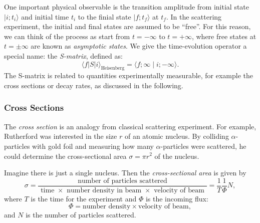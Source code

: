 One important physical observable is the transition amplitude from initial state $|i;t_i\rangle$ and initial time $t_i$ to the finial state $|f;t_f\rangle$ at $t_f$.
In the scattering experiment, the initial and final states are assumed to be ``free''.
For this reason, we can think of the process as start from $t=-\infty$ to $t=+\infty$, where free states at $t=\pm \infty$ are known as \textit{asymptotic states}.
We give the time-evolution operator a special name: the \textit{S-matrix}, defined as:
\begin{equation}
	\langle f|S| i\rangle_{\text{Heisenberg}}
	= \langle f ; \infty \mid i ;-\infty\rangle.
\end{equation}
The S-matrix is related to quantities experimentally measurable, for example the cross sections or decay rates, as discussed in the following.

\subsubsection{Cross Sections}
The \textit{cross section} is an analogy from classical scattering experiment.
For example, Rutherford was interested in the size $r$ of an atomic nucleus. 
By colliding $\alpha$-particles with gold foil and measuring how many $\alpha$-particles were scattered, he could determine the cross-sectional area $\sigma=\pi r^{2}$ of the nucleus. 

Imagine there is just a single nucleus. 
Then the \textit{cross-sectional area} is given by
\begin{equation}
	\sigma=\frac{\text { number of particles scattered }}{\text { time } \times \text { number density in beam } \times \text { velocity of beam }}=\frac{1}{T} \frac{1}{\Phi} N,
\end{equation}
where $T$ is the time for the experiment and $\Phi$ is the incoming flux:
\begin{equation*}
	\Phi= \text{number density} \times \text{velocity of beam},
\end{equation*}
and $N$ is the number of particles scattered.

